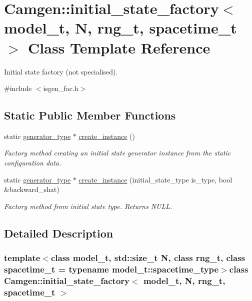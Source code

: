 \hypertarget{a00309}{}\section{Camgen\+:\+:initial\+\_\+state\+\_\+factory$<$ model\+\_\+t, N, rng\+\_\+t, spacetime\+\_\+t $>$ Class Template Reference}
\label{a00309}


Initial state factory (not specialised).  




{\ttfamily \#include $<$isgen\+\_\+fac.\+h$>$}

\subsection*{Static Public Member Functions}
\begin{DoxyCompactItemize}
\item 
static \hyperlink{a00308}{generator\+\_\+type} $\ast$ \hyperlink{a00309_ab04aebb8d2eb7986ee65701ab225667c}{create\+\_\+instance} ()
\begin{DoxyCompactList}\small\item\em Factory method creating an initial state generator instance from the static configuration data. \end{DoxyCompactList}\item 
\hypertarget{a00309_ac76cdf0ca75b11e495eb3401f3e827e6}{}static \hyperlink{a00308}{generator\+\_\+type} $\ast$ \hyperlink{a00309_ac76cdf0ca75b11e495eb3401f3e827e6}{create\+\_\+instance} (initial\+\_\+state\+\_\+type is\+\_\+type, bool \&backward\+\_\+shat)\label{a00309_ac76cdf0ca75b11e495eb3401f3e827e6}

\begin{DoxyCompactList}\small\item\em Factory method from initial state type. Returns N\+U\+L\+L. \end{DoxyCompactList}\end{DoxyCompactItemize}


\subsection{Detailed Description}
\subsubsection*{template$<$class model\+\_\+t, std\+::size\+\_\+t N, class rng\+\_\+t, class spacetime\+\_\+t = typename model\+\_\+t\+::spacetime\+\_\+type$>$class Camgen\+::initial\+\_\+state\+\_\+factory$<$ model\+\_\+t, N, rng\+\_\+t, spacetime\+\_\+t $>$}

